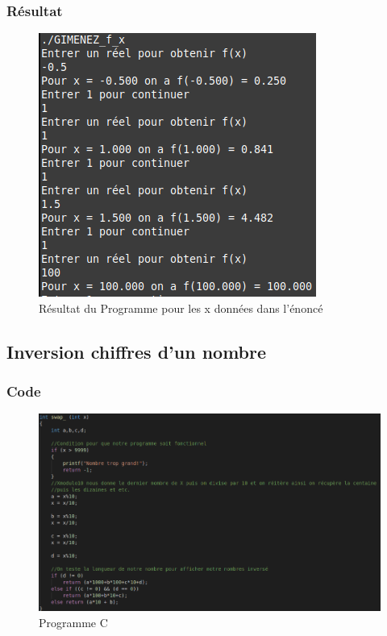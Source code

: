 \documentclass[10pt,a4paper]{article}
\begin{document}
\subsubsection{Résultat}
\begin{figure}[h]
\begin{center}
\includegraphics[scale=.3]{images/f_x_ex}
\end{center}
\caption{Résultat du Programme pour les x données dans l'énoncé}
\end{figure}
\pagebreak

\subsection{Inversion chiffres d'un nombre}
\subsubsection{Code}
\begin{figure}[h]
\begin{center}
\includegraphics[scale=.3]{images/swap_c}
\end{center}
\caption{Programme C}
\end{figure}
\end{document}
